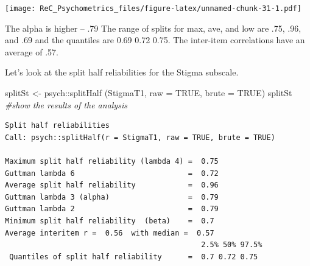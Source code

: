 \documentclass[
  english,
]{book}
\newenvironment{Shaded}{\begin{snugshade}}{\end{snugshade}}
\newcommand{\AttributeTok}[1]{\textcolor[rgb]{0.77,0.63,0.00}{#1}}
\newcommand{\CommentTok}[1]{\textcolor[rgb]{0.56,0.35,0.01}{\textit{#1}}}
\newcommand{\ConstantTok}[1]{\textcolor[rgb]{0.00,0.00,0.00}{#1}}
\newcommand{\DecValTok}[1]{\textcolor[rgb]{0.00,0.00,0.81}{#1}}
\newcommand{\FunctionTok}[1]{\textcolor[rgb]{0.00,0.00,0.00}{#1}}
\newcommand{\NormalTok}[1]{#1}
\newcommand{\OtherTok}[1]{\textcolor[rgb]{0.56,0.35,0.01}{#1}}
\newcommand{\SpecialCharTok}[1]{\textcolor[rgb]{0.00,0.00,0.00}{#1}}
\newcommand{\StringTok}[1]{\textcolor[rgb]{0.31,0.60,0.02}{#1}}
\begin{document}
\begin{Shaded}
\end{Shaded}

\texttt{[image: ReC\_Psychometrics\_files/figure-latex/unnamed-chunk-31-1.pdf]}

The alpha is higher -- .79 The range of splits for max, ave, and low are .75, .96, and .69 and the quantiles are 0.69 0.72 0.75. The inter-item correlations have an average of .57.

Let's look at the split half reliabilities for the Stigma subscale.

\begin{Shaded}
\begin{Highlighting}[]
\NormalTok{splitSt }\OtherTok{\textless{}{-}}\NormalTok{ psych}\SpecialCharTok{::}\FunctionTok{splitHalf}\NormalTok{ (StigmaT1, }\AttributeTok{raw =} \ConstantTok{TRUE}\NormalTok{, }\AttributeTok{brute =} \ConstantTok{TRUE}\NormalTok{)}
\NormalTok{splitSt }\CommentTok{\#show the results of the analysis}
\end{Highlighting}
\end{Shaded}

\begin{verbatim}
Split half reliabilities  
Call: psych::splitHalf(r = StigmaT1, raw = TRUE, brute = TRUE)

Maximum split half reliability (lambda 4) =  0.75
Guttman lambda 6                          =  0.72
Average split half reliability            =  0.96
Guttman lambda 3 (alpha)                  =  0.79
Guttman lambda 2                          =  0.79
Minimum split half reliability  (beta)    =  0.7
Average interitem r =  0.56  with median =  0.57
                                             2.5% 50% 97.5%
 Quantiles of split half reliability      =  0.7 0.72 0.75
\end{verbatim}

\begin{Shaded}
\end{Shaded}
\end{document}
